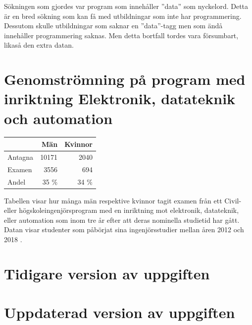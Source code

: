 \documentclass[a4paper, 10pt]{article}
\begin{document}
Sökningen som gjordes var program som innehåller 
''data'' som nyckelord. Detta är en bred 
sökning som kan få med utbildningar som inte 
har programmering. Dessutom skulle utbildningar 
som saknar en ''data''-tagg men som ändå 
innehåller programmering saknas. Men detta 
bortfall tordes vara försumbart, likaså den 
extra datan.

\section{Genomströmning på program med inriktning Elektronik, datateknik och automation}
\label{app:examen}

\begin{center}
\begin{tabular}{|l|rr|}
    \hline
            & Män       & Kvinnor \\ \hline
    Antagna & 10171     & 2040\\
    Examen  & 3556      & 694\\
    Andel   & 35 \%     & 34 \%\\ \hline
\end{tabular}
\end{center}

Tabellen visar hur många män respektive kvinnor 
tagit examen från ett Civil- eller 
högskoleingenjörsprogram med en inriktning mot 
elektronik, datateknik, eller automation som 
inom tre år efter att deras nominella studietid
har gått. Datan visar studenter som påbörjat sina 
ingenjörsstudier mellan åren 2012 och 2018 
\parencite{scbexamen2026}.



\clearpage

\section{Tidigare version av uppgiften}



\section{Uppdaterad version av uppgiften}


\end{document}
